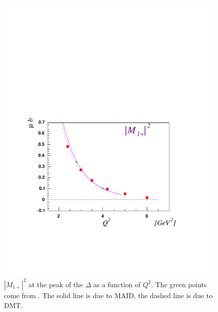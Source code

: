 \begin{figure}[h]
 \begin{center}
  \includegraphics[width=14cm, bb=40 100 520 460]{analysis/img/MM}
  \caption[$|M_{1+}|^2$ at the peak of the $\Delta$ as a function of $Q^2$]
          { $|M_{1+}|^2$ at the peak of the $\Delta$ as a function of $Q^2$.
	             The green points come from \cite{bib:frolov}. The solid line is due to MAID, 
		     the dashed line is due to DMT.}
 \label{fig:MM}
  \end{center} 
\end{figure} 





















